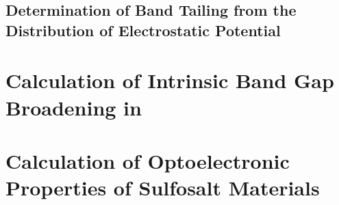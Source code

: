 \subsection{Determination of Band Tailing from the Distribution of Electrostatic Potential}


\section{Calculation of Intrinsic Band Gap Broadening in \CZTS}


\section{Calculation of Optoelectronic Properties of Sulfosalt Materials}

                            